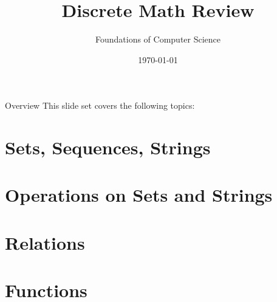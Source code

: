 \documentclass[style=sailor,size=12pt]{powerdot}
\title{Discrete Math Review}
\author{Foundations of Computer Science}
\date{\today}
\begin{document}
\maketitle

\begin{slide}[toc=,bm=]{Overview}
This slide set covers the following topics:

\vspace{5mm}
\tableofcontents[content=sections]
\end{slide}

\section[slide=true]{Sets, Sequences, Strings} 


\section[slide=true]{Operations on Sets and Strings}


\section[slide=true]{Relations}


\section[slide=true]{Functions}

\end{document}
